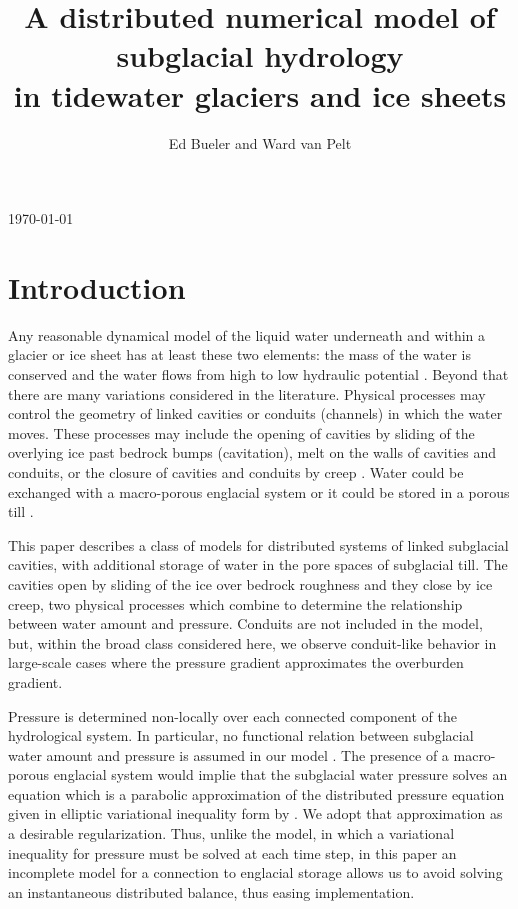 \documentclass[11pt,final]{amsart}
\title[]{A distributed numerical model of subglacial hydrology \\ in tidewater glaciers and ice sheets}
\author[]{Ed Bueler and Ward van Pelt}
\begin{document}
\graphicspath{{figs/}}

\scriptsize \hfill \today \normalsize
\vspace{0.5in}

\maketitle
\thispagestyle{empty}


\section{Introduction}

Any reasonable dynamical model of the liquid water underneath and within a glacier or ice sheet has at least these two elements: the mass of the water is conserved and the water flows from high to low hydraulic potential \citep{Clarke05}.  Beyond that there are many variations considered in the literature.  Physical processes may control the geometry of linked cavities \citep{Kamb1987} or conduits (channels) \citep{Nye1976} in which the water moves.  These processes may include the opening of cavities by sliding of the overlying ice past bedrock bumps (cavitation), melt on the walls of cavities and conduits, or the closure of cavities and conduits by creep \citep{Hewitt2011}.  Water could be exchanged with a macro-porous englacial system \citep{Bartholomausetal2011} or it could be stored in a porous till \citep{Tulaczyketal2000b}.

This paper describes a class of models for distributed systems of linked subglacial cavities, with additional storage of water in the pore spaces of subglacial till.  The cavities open by sliding of the ice over bedrock roughness and they close by ice creep, two physical processes which combine to determine the relationship between water amount and pressure.  Conduits are not included in the model, but, within the broad class considered here, we observe conduit-like behavior in large-scale cases where the pressure gradient approximates the overburden gradient.

Pressure is determined non-locally over each connected component of the hydrological system.  In particular, no functional relation between subglacial water amount and pressure is assumed in our model \citep[compare][]{FlowersClarke2002_theory}.  The presence of a macro-porous englacial system would implie that the subglacial water pressure solves an equation which is a parabolic approximation of the distributed pressure equation given in elliptic variational inequality form by \cite{Schoofetal2012}.  We adopt that approximation as a desirable regularization.  Thus, unlike the \cite{Schoofetal2012} model, in which a variational inequality for pressure must be solved at each time step, in this paper an incomplete model for a connection to englacial storage allows us to avoid solving an instantaneous distributed balance, thus easing implementation.
\end{document}
